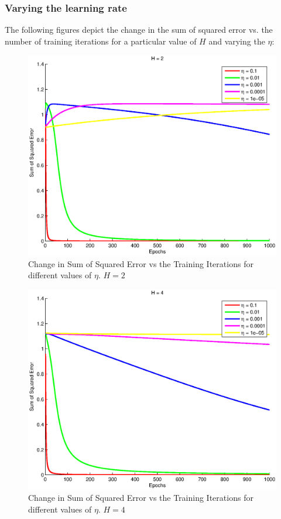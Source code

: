 \documentclass{article}
\newcommand{\myScale}{0.56}
\begin{document}
\subsubsection{Varying the learning rate}
The following figures depict the change in the sum of squared error vs. the number of training iterations for a particular value of $H$ and varying the $\eta$:
\begin{figure}[H]
\includegraphics[scale=\myScale]{../eps2/H2.eps}
\caption{Change in Sum of Squared Error vs the Training Iterations for different values 
of $\eta$. $H=2$}
\label{fig:fig6}
\end{figure}
\begin{figure}[H]
\includegraphics[scale=\myScale]{../eps2/H4.eps}
\caption{Change in Sum of Squared Error vs the Training Iterations for different values of $\eta$. $H=4$}
\label{fig:fig7}
\end{figure}
\end{document}
